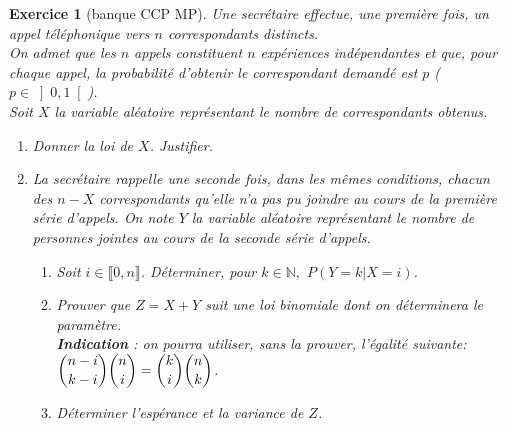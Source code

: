 \documentclass[12pt,a4paper]{article}
\newtheorem{Exo}{Exercice}
\begin{document}
\begin{Exo}[banque CCP MP]
	Une secrétaire effectue, une première fois, un appel téléphonique vers $n$ correspondants distincts.\\
On admet que les $n$ appels constituent $n$ expériences indépendantes et que, pour chaque appel, la probabilité d'obtenir le correspondant demandé est $p$ ($p\in{\left]  0,1\right[ }$).\\
Soit $X$ la variable aléatoire représentant le nombre de correspondants obtenus.
\begin{enumerate}
	\item Donner la loi de $X$. Justifier.
	\item
	La secrétaire rappelle une seconde fois, dans les mêmes conditions, chacun des $n-X$ correspondants qu'elle n'a pas pu joindre au cours de la première série d'appels.
	On note $Y$ la variable aléatoire représentant le nombre de personnes jointes au cours de la seconde série d'appels.
	\begin{enumerate}
		\item
		Soit $i\in \llbracket 0,n \rrbracket $.
		Déterminer, pour  $k\in \mathbb{N}, $ $P(Y=k|X=i)$.
		\item
		Prouver que $Z=X+Y$ suit une loi binomiale dont on déterminera le paramètre.\\
		\textbf{Indication} : on pourra utiliser, sans la prouver, l'égalité suivante: $\dbinom{n-i}{k-i}\dbinom{n}{i}=\dbinom{k}{i}\dbinom{n}{k}$.\\
		\item
		Déterminer l'espérance et la variance de $Z$.
	\end{enumerate}
\end{enumerate}

\end{Exo}
\end{document}

